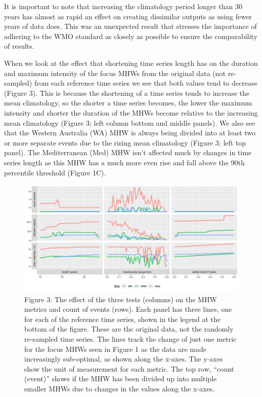 \documentclass[utf8]{frontiersSCNS} %
\begin{document}
It is important to note that increasing the climatology period longer
than 30 years has almost as rapid an effect on creating dissimilar
outputs as using fewer years of data does. This was an unexpected result
that stresses the importance of adhering to the WMO standard as closely
as possible to ensure the comparability of results.

When we look at the effect that shortening time series length has on the
duration and maximum intensity of the focus MHWs from the original data
(not re-sampled) from each reference time series we see that both values
tend to decrease (Figure 3). This is because the shortening of a time
series tends to increase the mean climatology, so the shorter a time
series becomes, the lower the maximum intensity and shorter the duration
of the MHWs become relative to the increasing mean climatology (Figure
3; left column bottom and middle panels). We also see that the Western
Australia (WA) MHW is always being divided into at least two or more
separate events due to the rising mean climatology (Figure 3; left top
panel). The Mediterranean (Med) MHW isn't affected much by changes in
time series length as this MHW has a much more even rise and fall above
the 90th percentile threshold (Figure 1C).

\begin{figure}
\centering
\includegraphics{../LaTeX/fig_3.png}
\caption{Figure 3: The effect of the three tests (columns) on the MHW
metrics and count of events (rows). Each panel has three lines, one for
each of the reference time series, shown in the legend at the bottom of
the figure. These are the original data, not the randomly re-sampled
time series. The lines track the change of just one metric for the focus
MHWs seen in Figure 1 as the data are made increasingly sub-optimal, as
shown along the x-axes. The y-axes show the unit of measurement for each
metric. The top row, ``count (event)'' shows if the MHW has been divided
up into multiple smaller MHWs due to changes in the values along the
x-axes.}
\end{figure}
\end{document}
